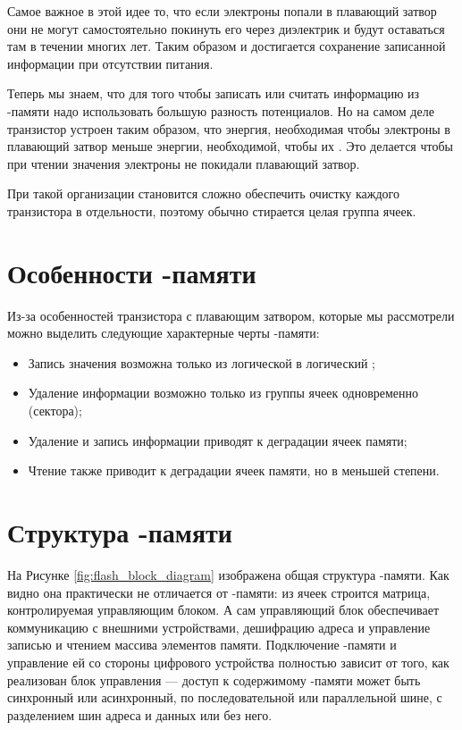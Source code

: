 \par{Самое важное в этой идее то, что если электроны попали в плавающий затвор они не могут самостоятельно покинуть его через диэлектрик и будут оставаться там в течении многих лет. Таким образом и достигается сохранение записанной информации при отсутствии питания.}

\par{Теперь мы знаем, что для того чтобы записать или считать информацию из -памяти надо использовать большую разность потенциалов. Но на самом деле транзистор устроен таким образом, что энергия, необходимая чтобы  электроны в плавающий затвор меньше энергии, необходимой, чтобы их . Это делается чтобы при чтении значения электроны не покидали плавающий затвор.}

\par{При такой организации становится сложно обеспечить очистку каждого транзистора в отдельности, поэтому обычно стирается целая группа ячеек.}

\section{Особенности -памяти}

\par{Из-за особенностей транзистора с плавающим затвором, которые мы рассмотрели можно выделить следующие характерные черты -памяти:
\begin{itemize}
  \item Запись значения возможна только из логической  в логический ;
  \item Удаление информации возможно только из группы ячеек одновременно (сектора);
  \item Удаление и запись информации приводят к деградации ячеек памяти;
  \item Чтение также приводит к деградации ячеек памяти, но в меньшей степени.
\end{itemize}}

\section{Структура -памяти}

\par{На Рисунке \ref{fig:flash_block_diagram} изображена общая структура -памяти. Как видно она практически не отличается от -памяти: из ячеек строится матрица, контролируемая управляющим блоком. А сам управляющий блок обеспечивает коммуникацию с внешними устройствами, дешифрацию адреса и управление записью и чтением массива элементов памяти. Подключение -памяти и управление ей со стороны цифрового устройства полностью зависит от того, как реализован блок управления --- доступ к содержимому -памяти может быть синхронный или асинхронный, по последовательной или параллельной шине, с разделением шин адреса и данных или без него.}

